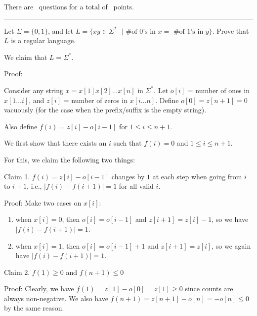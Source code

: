 \documentclass[answers]{exam}
\begin{document}
\vspace{0.1in}

\vspace{0.1in}
There are \numquestions\, questions for a total of \numpoints\, points.
\vspace{0.1in}
\hrule
\vspace{0.2in}
\begin{questions}

    \question[4] 
    Let $\Sigma=\{0,1\}$, and let $L=\{xy\in\Sigma^*\text{ }|\text{ \# of 0's in }x=\text{ \# of 1's in }y\}$. Prove that $L$ is a regular language.

    \begin{solution}
        We claim that $L = \Sigma^*$.

        Proof:

        Consider any string $x = x[1] x[2] \ldots x[n]$ in $\Sigma^*$. Let $o[i]$ = number of ones in $x[1 \ldots i]$, and $z[i]$ = number of zeros in $x[i \ldots n]$. Define $o[0] = z[n + 1] = 0$ vacuously (for the case when the prefix/suffix is the empty string).

        Also define $f(i) = z[i] - o[i - 1]$ for $1 \le i \le n + 1$.

        We first show that there exists an $i$ such that $f(i) = 0$ and $1 \le i \le n + 1$.

        For this, we claim the following two things:

        Claim 1. $f(i) = z[i] - o[i - 1]$ changes by $1$ at each step when going from $i$ to $i + 1$, i.e., $|f(i) - f(i + 1)| = 1$ for all valid $i$.
        
        Proof: Make two cases on $x[i]$:
        \begin{enumerate}
            \item when $x[i] = 0$, then $o[i] = o[i - 1]$ and $z[i + 1] = z[i] - 1$, so we have $|f(i) - f(i + 1)| = 1$.
            \item when $x[i] = 1$, then $o[i] = o[i - 1] + 1$ and $z[i + 1] = z[i]$, so we again have $|f(i) - f(i + 1)| = 1$.
        \end{enumerate}

        Claim 2. $f(1) \ge 0$ and $f(n + 1) \le 0$

        Proof: Clearly, we have $f(1) = z[1] - o[0] = z[1] \ge 0$ since counts are always non-negative. We also have $f(n + 1) = z[n + 1] - o[n] = -o[n] \le 0$ by the same reason.


\end{solution}
\end{questions}
\end{document}
